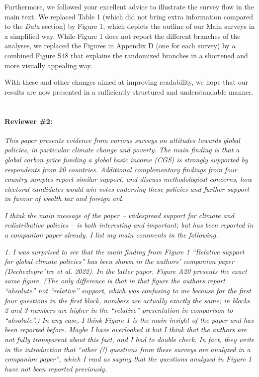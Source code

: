 \documentclass[12pt,english]{article}
\begin{document}
Furthermore, we followed your excellent advice to illustrate the survey flow in the main text. We replaced Table 1 (which did not bring extra information compared to the \textit{Data} section) by Figure 1, which depicts the outline of our Main surveys in a simplified way. While Figure 1 does not report the different branches of the analyses, we replaced the Figures in Appendix D (one for each survey) by a combined Figure S48 %
that explains the randomized branches in a shortened and more visually appealing way. 

With these and other changes aimed at improving readability, we hope that our results are now presented in a sufficiently structured and understandable manner.
~\\


\paragraph*{Reviewer \#2:}

\textit{This paper presents evidence from various surveys on attitudes towards global policies, in particular climate change and poverty. The main finding is that a global carbon price funding a global basic income (CGS) is strongly supported by respondents from 20 countries. Additional complementary findings from four country samples report similar support, and discuss methodological concerns, how electoral candidates would win votes endorsing these policies and further support in favour of wealth tax and foreign aid.}

\textit{I think the main message of the paper – widespread support for climate and redistributive policies – is both interesting and important; but has been reported in a companion paper already. I list my main comments in the following.}

\textit{1. I was surprised to see that the main finding from Figure 1 “Relative support for global climate policies” has been shown in the authors’ companion paper (Dechezlepreˆtre et al. 2022). In the latter paper, Figure A20 presents the exact same figure. (The only difference is that in that figure the authors report “absolute” not “relative” support, which was confusing to me because for the first four questions in the first block, numbers are actually exactly the same; in blocks 2 and 3 numbers are higher in the “relative” presentation in comparison to “absolute”.) In any case, I think Figure 1 is the main insight of the paper and has been reported before. Maybe I have overlooked it but I think that the authors are not fully transparent about this fact, and I had to double check. In fact, they write in the introduction that “other (!) questions from these surveys are analyzed in a companion paper”, which I read as saying that the questions analyzed in Figure 1 have not been reported previously.}
\end{document}
